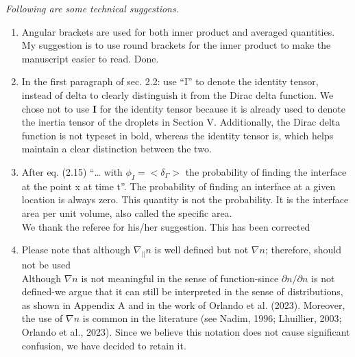 \documentclass[10pt,a4paper]{article}
\newcommand{\tb}[1]{\color{blue}#1\color{black}}
\begin{document}
\textit{Following are some technical suggestions.}


\begin{enumerate}
    \item Angular brackets are used for both inner product and averaged quantities. My suggestion is to use round brackets for the inner product to make the manuscript easier to read.
    \tb{Done.}%
    \item In the first paragraph of sec. 2.2: use “I” to denote the identity tensor, instead of delta to
    clearly distinguish it from the Dirac delta function.
    \tb{
        We chose not to use \textbf{I} for the identity tensor because it is already used to denote the inertia tensor of the droplets in Section V. 
        Additionally, the Dirac delta function is not typeset in bold, whereas the identity tensor is, which helps maintain a clear distinction between the two.
     }
    \item After eq. (2.15) “… with $\phi_I = <\delta_\Gamma>$ the probability of finding the interface at the point x at
    time t”. The probability of finding an interface at a given location is always zero. This
    quantity is not the probability. It is the interface area per unit volume, also called the specific
    area.\\
    \tb{We thank the referee for his/her suggestion. This has been corrected}
    \item Please note that although $\nabla_{||} n$ is well defined but not $\nabla n$; therefore, should not be used
    \\
    \tb{Although $\nabla n$ is not meaningful in the sense of function-since $\partial n / \partial n$ is not defined-we argue that it can still be interpreted in the sense of distributions, as shown in Appendix A and in the work of Orlando et al. (2023). 
    Moreover, the use of $\nabla n$ is common in the literature (see Nadim, 1996; Lhuillier, 2003; Orlando et al., 2023).
    Since we believe this notation does not cause significant confusion, we have decided to retain it.}
        
\end{enumerate}
\end{document}
